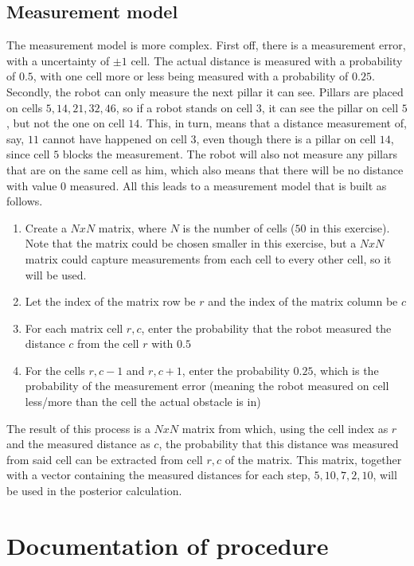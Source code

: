 \documentclass[11pt]{article}
\begin{document}
    \subsection{Measurement model}\label{subsec:measurem}
    The measurement model is more complex.
    First off, there is a measurement error, with a uncertainty of $\pm 1$ cell.
    The actual distance is measured with a probability of $0.5$, with one cell more or less being measured with a probability of $0.25$.
    Secondly, the robot can only measure the next pillar it can see.
    Pillars are placed on cells $5, 14, 21, 32, 46$, so if a robot stands on cell $3$, it can see the pillar on cell $5$, but not the one on cell $14$.
    This, in turn, means that a distance measurement of, say, $11$ cannot have happened on cell $3$, even though there is a pillar on cell $14$, since cell $5$ blocks the measurement.
    The robot will also not measure any pillars that are on the same cell as him, which also means that there will be no distance with value $0$ measured.\newline
    All this leads to a measurement model that is built as follows.
    \begin{enumerate}
        \item Create a $N x N$ matrix, where $N$ is the number of cells ($50$ in this exercise).
        Note that the matrix could be chosen smaller in this exercise, but a $N x N$ matrix could capture measurements from each cell to every other cell, so it will be used.
        \item Let the index of the matrix row be $r$ and the index of the matrix column be $c$
        \item For each matrix cell $r,c$, enter the probability that the robot measured the distance $c$ from the cell $r$ with $0.5$
        \item For the cells $r,c-1$ and $r,c+1$, enter the probability $0.25$, which is the probability of the measurement error (meaning the robot measured on cell less/more than the cell the actual obstacle is in)
    \end{enumerate}
    The result of this process is a $N x N$ matrix from which, using the cell index as $r$ and the measured distance as $c$, the probability that this distance was measured from said cell can be extracted from cell $r,c$ of the matrix.
    This matrix, together with a vector containing the measured distances for each step, $5,10,7,2,10$, will be used in the posterior calculation.

    \section{Documentation of procedure}\label{sec:proc}
\end{document}
